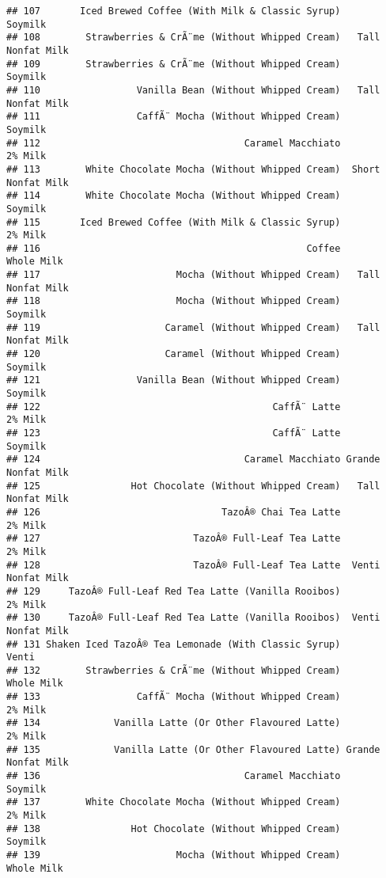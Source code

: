 \documentclass[
]{article}
\begin{document}
\begin{verbatim}
## 107       Iced Brewed Coffee (With Milk & Classic Syrup)            Soymilk
## 108        Strawberries & CrÃ¨me (Without Whipped Cream)   Tall Nonfat Milk
## 109        Strawberries & CrÃ¨me (Without Whipped Cream)            Soymilk
## 110                 Vanilla Bean (Without Whipped Cream)   Tall Nonfat Milk
## 111                 CaffÃ¨ Mocha (Without Whipped Cream)            Soymilk
## 112                                    Caramel Macchiato            2% Milk
## 113        White Chocolate Mocha (Without Whipped Cream)  Short Nonfat Milk
## 114        White Chocolate Mocha (Without Whipped Cream)            Soymilk
## 115       Iced Brewed Coffee (With Milk & Classic Syrup)            2% Milk
## 116                                               Coffee         Whole Milk
## 117                        Mocha (Without Whipped Cream)   Tall Nonfat Milk
## 118                        Mocha (Without Whipped Cream)            Soymilk
## 119                      Caramel (Without Whipped Cream)   Tall Nonfat Milk
## 120                      Caramel (Without Whipped Cream)            Soymilk
## 121                 Vanilla Bean (Without Whipped Cream)            Soymilk
## 122                                         CaffÃ¨ Latte            2% Milk
## 123                                         CaffÃ¨ Latte            Soymilk
## 124                                    Caramel Macchiato Grande Nonfat Milk
## 125                Hot Chocolate (Without Whipped Cream)   Tall Nonfat Milk
## 126                                TazoÂ® Chai Tea Latte            2% Milk
## 127                           TazoÂ® Full-Leaf Tea Latte            2% Milk
## 128                           TazoÂ® Full-Leaf Tea Latte  Venti Nonfat Milk
## 129     TazoÂ® Full-Leaf Red Tea Latte (Vanilla Rooibos)            2% Milk
## 130     TazoÂ® Full-Leaf Red Tea Latte (Vanilla Rooibos)  Venti Nonfat Milk
## 131 Shaken Iced TazoÂ® Tea Lemonade (With Classic Syrup)              Venti
## 132        Strawberries & CrÃ¨me (Without Whipped Cream)         Whole Milk
## 133                 CaffÃ¨ Mocha (Without Whipped Cream)            2% Milk
## 134             Vanilla Latte (Or Other Flavoured Latte)            2% Milk
## 135             Vanilla Latte (Or Other Flavoured Latte) Grande Nonfat Milk
## 136                                    Caramel Macchiato            Soymilk
## 137        White Chocolate Mocha (Without Whipped Cream)            2% Milk
## 138                Hot Chocolate (Without Whipped Cream)            Soymilk
## 139                        Mocha (Without Whipped Cream)         Whole Milk

\end{verbatim}
\end{document}
